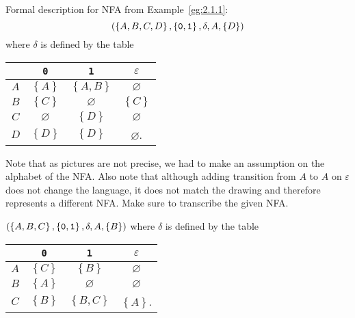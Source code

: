 \documentclass{notes}
\begin{document}
\begin{eg}
  Formal description for NFA from Example~\ref{eg:2.1.1}: 
  \[
    \left ( \left \{ A, B, C, D \right \}, \left \{ \verb~0~, \verb~1~ \right \}, \delta, A, \left \{ D \right \} \right )
  \]
  where $\delta$ is defined by the table 
  \begin{center}
    \begin{tabular}{c|ccc}
      & \verb~0~ & \verb~1~ & $\varepsilon$ \\ 
      \hline
      $A$ & $\left \{ A \right \}$ & $\left \{ A, B \right \}$ & $\varnothing$ \\ 
      $B$ & $\left \{ C \right \}$ & $\varnothing$ & $\left \{ C \right \}$ \\ 
      $C$ & $\varnothing$ & $\left \{ D \right \}$ & $\varnothing$ \\ 
      $D$ & $\left \{ D \right \}$ & $\left \{ D \right \}$ & $\varnothing$.
    \end{tabular}
  \end{center}
  
  Note that as pictures are not precise, we had to make an assumption on the alphabet of the NFA.
  Also note that although adding transition from $A$ to $A$ on $\varepsilon$ does not change the language, it does not match the drawing and therefore represents a different NFA.
  Make sure to transcribe the given NFA.
\end{eg}

\begin{eg}
  $(\left \{ A, B, C \right \}, \left \{ \verb~0~, \verb~1~ \right \}, \delta, A, \left \{ B \right \})$ where $\delta$ is defined by the table 
  \begin{center}
    \begin{tabular}{c|ccc}
      & \verb~0~ & \verb~1~ & $\varepsilon$ \\ 
      \hline
      $A$ & $\left \{ C \right \}$ & $\left \{ B \right \}$ & $\varnothing$ \\ 
      $B$ & $\left \{ A \right \}$ & $\varnothing$ & $\varnothing$ \\ 
      $C$ & $\left \{ B \right \}$ & $\left \{ B, C \right \}$ & $\left \{ A \right \}$. 
    \end{tabular}
  \end{center}
  
  \begin{center}
  \end{center}
\end{eg}
\end{document}
